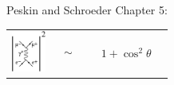 \begin{slide*}
\begin{minipage}[t]{\linewidth}
\vspace{1 cm}

\begin{minipage}{\linewidth}
  \huge Peskin and Schroeder Chapter 5:
  \begin{center}
    \begin{tabular}{p{0.15\linewidth} p{0.1\linewidth} p{0.15\linewidth}}
      \begin{minipage}{\linewidth}
	\includegraphics[width=\linewidth]{qed_diagram.eps}
      \end{minipage} &
      \begin{minipage}{\linewidth}
	\Huge \[ \sim \]
      \end{minipage} &
      \begin{minipage}{\linewidth}
	\Huge \[ 1 + \cos^2 \theta \]
      \end{minipage}
    \end{tabular}
    \begin{minipage}{\linewidth}
      \vspace{-1 cm}
      \begin{center}

\end{center}
\end{minipage}
\end{center}
\end{minipage}
\end{minipage}
\end{slide*}
